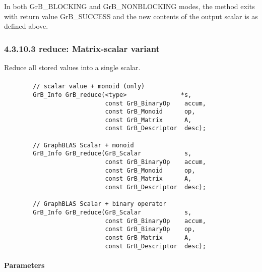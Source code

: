 In both {\sf GrB\_BLOCKING} and {\sf GrB\_NONBLOCKING} modes, the method exits with return value 
{\sf GrB\_SUCCESS} and the new contents of the output scalar is as defined above.



\subsubsection*{4.3.10.3 {\sf reduce}: Matrix-scalar variant}

Reduce all stored values into a single scalar.

\paragraph{\syntax}

\begin{verbatim}
        // scalar value + monoid (only)
        GrB_Info GrB_reduce(<type>               *s,
                            const GrB_BinaryOp    accum,
                            const GrB_Monoid      op,
                            const GrB_Matrix      A,
                            const GrB_Descriptor  desc);

        // GraphBLAS Scalar + monoid
        GrB_Info GrB_reduce(GrB_Scalar            s,
                            const GrB_BinaryOp    accum,
                            const GrB_Monoid      op,
                            const GrB_Matrix      A,
                            const GrB_Descriptor  desc);

        // GraphBLAS Scalar + binary operator
        GrB_Info GrB_reduce(GrB_Scalar            s,
                            const GrB_BinaryOp    accum,
                            const GrB_BinaryOp    op,
                            const GrB_Matrix      A,
                            const GrB_Descriptor  desc);
\end{verbatim}

\paragraph{Parameters}

